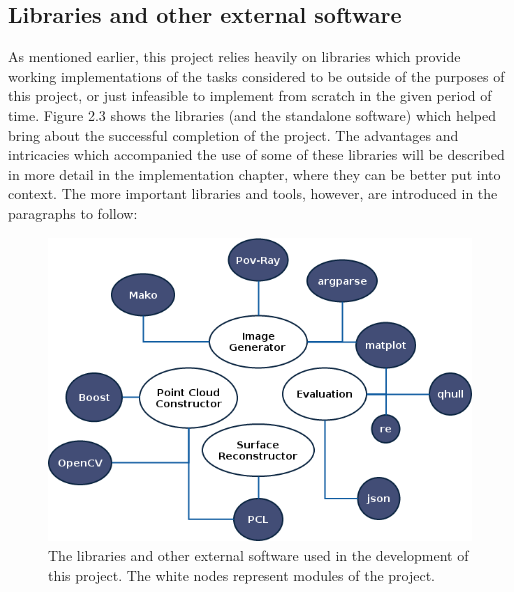 \documentclass[12pt,a4paper,twoside,openright]{report}
\begin{document}
\subsection{Libraries and other external software}
As mentioned earlier, this project relies heavily on libraries which provide working implementations of the tasks considered to be outside of the purposes of this project, or just infeasible to implement from scratch in the given period of time. Figure 2.3 shows the libraries (and the standalone software) which helped bring about the successful completion of the project. The advantages and intricacies which accompanied the use of some of these libraries will be described in more detail in the implementation chapter, where they can be better put into context. The more important libraries and tools, however, are introduced in the paragraphs to follow:

\begin{figure}
\centerline{\includegraphics[scale=0.7]{figs/libraries1.png}}
\caption{The libraries and other external software used in the development of this project. The white nodes represent modules of the project.}
\end{figure}
\end{document}
